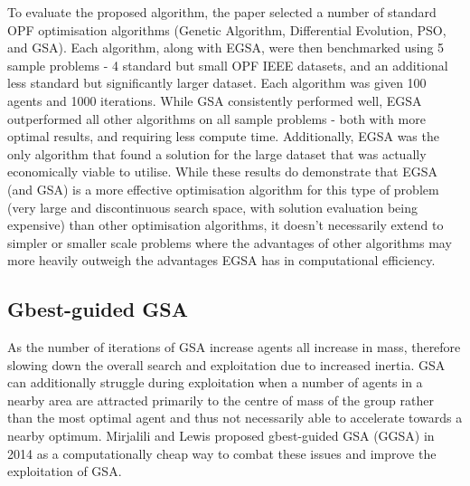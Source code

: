 To evaluate the proposed algorithm, the paper selected a number of standard OPF optimisation algorithms (Genetic Algorithm, Differential Evolution, PSO, and GSA).
Each algorithm, along with EGSA, were then benchmarked using 5 sample problems - 4 standard but small OPF IEEE datasets, and an additional less standard but significantly larger dataset.
Each algorithm was given 100 agents and 1000 iterations.
While GSA consistently performed well, EGSA outperformed all other algorithms on all sample problems - both with more optimal results, and requiring less compute time.
Additionally, EGSA was the only algorithm that found a solution for the large dataset that was actually economically viable to utilise.
While these results do demonstrate that EGSA (and GSA) is a more effective optimisation algorithm for this type of problem (very large and discontinuous search space, with solution evaluation being expensive) than other optimisation algorithms, it doesn't necessarily extend to simpler or smaller scale problems where the advantages of other algorithms may more heavily outweigh the advantages EGSA has in computational efficiency.


\subsection{Gbest-guided GSA}\label{sec:alg:gsa:ggsa}
As the number of iterations of GSA increase agents all increase in mass, therefore slowing down the overall search and exploitation due to increased inertia.
GSA can additionally struggle during exploitation when a number of agents in a nearby area are attracted primarily to the centre of mass of the group rather than the most optimal agent and thus not necessarily able to accelerate towards a nearby optimum.
Mirjalili and Lewis \cite{GGSA} proposed gbest-guided GSA (GGSA) in 2014 as a computationally cheap way to combat these issues and improve the exploitation of GSA.


